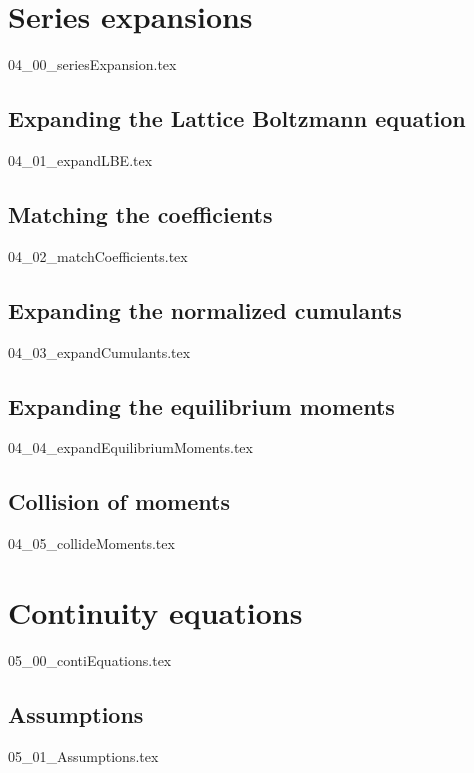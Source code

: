 \documentclass[12pt,a4paper,twoside]{article}
\begin{document}
\section{Series expansions}
\label{sec:Series expansions}
{04_00_seriesExpansion.tex}


\subsection{Expanding the Lattice Boltzmann equation}
\label{sub:Expanding the Lattice Boltzmann equation}
{04_01_expandLBE.tex}

\subsection{Matching the coefficients}
\label{sub:Matching the coefficients}
{04_02_matchCoefficients.tex}

\subsection{Expanding the normalized cumulants}
\label{sub:Expanding the normalized cumulants}
{04_03_expandCumulants.tex}

\subsection{Expanding the equilibrium moments}
\label{sub:Expanding the equilibrium moments}
{04_04_expandEquilibriumMoments.tex}

\subsection{Collision of moments}
\label{sub:Collision of moments}
{04_05_collideMoments.tex}

\section{Continuity equations}
\label{sec:Continuity equations}
{05_00_contiEquations.tex}

\subsection{Assumptions}
\label{sub:Assumptions}
{05_01_Assumptions.tex}
\end{document}
